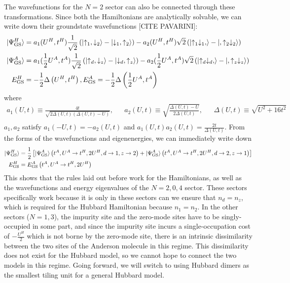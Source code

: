 \documentclass[10pt]{report}
\numberwithin{equation}{section}
\begin{document}
The wavefunctions for the \(N=2\) sector can also be connected through these transformations. Since both the Hamiltonians are analytically solvable, we can write down their groundstate wavefunctions [CITE PAVARINI]:
\begin{equation}\begin{aligned}
	\ket{\Psi^H_\text{GS}} &= a_1(U^H, t^H)\frac{1}{\sqrt 2}\left(\ket{\uparrow_1, \downarrow_2} - \ket{\downarrow_1, \uparrow_2}\right) - a_2(U^H,t^H){\sqrt 2}\left(\ket{\uparrow_1\downarrow_1, } - \ket{,\uparrow_2\downarrow_2}\right)\\
	\ket{\Psi^A_\text{GS}} &= a_1(\frac{1}{2}U^A, t^A)\frac{1}{\sqrt 2}\left(\ket{\uparrow_d, \downarrow_z} - \ket{\downarrow_d, \uparrow_z}\right) - a_2(\frac{1}{2}U^A,t^A){\sqrt 2}\left(\ket{\uparrow_d\downarrow_d, } - \ket{,\uparrow_z\downarrow_z}\right)\\
	E^H_\text{GS} &=  -\frac{1}{2}\Delta\left( U^H, t^H \right), E^A_\text{GS} =  -\frac{1}{2}\Delta\left( \frac{1}{2}U^A, t^A \right)
\end{aligned}\end{equation}
where 
\begin{equation}\begin{aligned}
	a_1(U,t) \equiv \frac{4t}{\sqrt{2\Delta(U,t)\left( \Delta(U,t) - U \right) }}, && a_2(U,t) \equiv \sqrt{\frac{\Delta(U,t) - U}{2\Delta(U,t)}}, &&\Delta(U,t) \equiv \sqrt{U^2 + 16t^2}\\
\end{aligned}\end{equation}
$a_1,a_2$ satisfy $a_1(-U,t) = -a_2(U,t)$ and $a_1(U,t)a_2(U,t)= \frac{2t}{\Delta(U,t)}$.
From the forms of the wavefunctions and eigenenergies, we can immediately write down
\begin{equation}\begin{aligned}
	\ket{\Psi^H_\text{GS}} &= \frac{1}{2}\left[\ket{\Psi^A_\text{GS}}\left(t^A, U^A \to t^H, 2U^H, d \to 1, z \to 2\right) + \ket{\Psi^A_\text{GS}}\left(t^A, U^A \to t^H, 2U^H, d \to 2, z \to 1\right)\right]\\
	E^H_\text{GS} &= E^A_\text{GS}\left(t^A, U^A \to t^H, 2U^H\right)
\end{aligned}\end{equation}
This shows that the rules laid out before work for the Hamiltonians, as well as the wavefunctions and energy eigenvalues of the \(N=2,0,4\) sector. These sectors specifically work because it is only in these sectors can we ensure that \(n_d = n_z\), which is required for the Hubbard Hamiltonian because \(n_1 = n_2\). In the other sectors (\(N=1,3\)), the impurity site and the zero-mode sites have to be singly-occupied in some part, and since the impurity site incurs a single-occupation cost of \(-\frac{U^H}{2}\) which is not borne by the zero-mode site, there is an intrinsic dissimilarity between the two sites of the Anderson molecule in this regime. This dissimilarity does not exist for the Hubbard model, so we cannot hope to connect the two models in this regime. Going forward, we will switch to using Hubbard dimers as the smallest tiling unit for a general Hubbard model.
\end{document}
